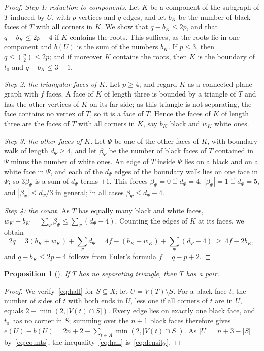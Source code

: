 \documentclass[a4paper]{amsart}
\numberwithin{equation}{section}
\newtheorem{proposition}[equation]{Proposition}
\theoremstyle{definition}
\newcommand{\step}[1]{\emph{#1}\enspace}
\begin{document}
\begin{proof}
\step{Step 1: reduction to components.}
Let $K$ be a component of the subgraph of $T$ induced by $U$, with $p$ vertices and $q$ edges, and let $b_K$ be the number of black faces of $T$ with all corners in $K$.
We show that $q-b_K\le 2p$, and that $q-b_K\le 2p-4$ if $K$ contains the roots.
This suffices, as the roots lie in one component and $b(U)$ is the sum of the numbers $b_K$.
If $p\le3$, then $q\le\binom p2\le 2p$; and if moreover $K$ contains the roots, then $K$ is the boundary of $t_0$ and $q-b_K\le 3-1$.

\step{Step 2: the triangular faces of $K$.}
Let $p\ge4$, and regard $K$ as a connected plane graph with $f$ faces.
A face of $K$ of length three is bounded by a triangle of $T$ and has the other vertices of $K$ on its far side; as this triangle is not separating, the face contains no vertex of $T$, so it is a face of $T$.
Hence the faces of $K$ of length three are the faces of $T$ with all corners in $K$, say $b_K$ black and $w_K$ white ones.

\step{Step 3: the other faces of $K$.}
Let $\Psi$ be one of the other faces of $K$, with boundary walk of length $d_\Psi\ge4$, and let $\beta_\Psi$ be the number of black faces of $T$ contained in $\Psi$ minus the number of white ones.
An edge of $T$ inside $\Psi$ lies on a black and on a white face in $\Psi$, and each of the $d_\Psi$ edges of the boundary walk lies on one face in $\Psi$; so $3\beta_\Psi$ is a sum of $d_\Psi$ terms $\pm1$.
This forces $\beta_\Psi=0$ if $d_\Psi=4$, $|\beta_\Psi|=1$ if $d_\Psi=5$, and $|\beta_\Psi|\le d_\Psi/3$ in general; in all cases $\beta_\Psi\le d_\Psi-4$.

\step{Step 4: the count.}
As $T$ has equally many black and white faces, $w_K-b_K=\sum_\Psi\beta_\Psi\le\sum_\Psi(d_\Psi-4)$.
Counting the edges of $K$ at its faces, we obtain
\[
2q=3(b_K+w_K)+\sum_\Psi d_\Psi=4f-(b_K+w_K)+\sum_\Psi(d_\Psi-4)\ \ge\ 4f-2b_K ,
\]
and $q-b_K\le 2p-4$ follows from Euler's formula $f=q-p+2$.
\end{proof}

\begin{proposition}[{\cite[Proposition~3.1]{OpenAI}}]\label{prop:pair}
If $T$ has no separating triangle, then $T$ has a pair.
\end{proposition}

\begin{proof}
We verify~\eqref{eq:hall} for $S\subseteq X$; let $U=V(T)\setminus S$.
For a black face $t$, the number of sides of $t$ with both ends in $U$, less one if all corners of $t$ are in $U$, equals $2-\min(2,|V(t)\cap S|)$.
Every edge lies on exactly one black face, and $t_0$ has no corner in $S$; summing over the $n+1$ black faces therefore gives $e(U)-b(U)=2n+2-\sum_{t\in A}\min(2,|V(t)\cap S|)$.
As $|U|=n+3-|S|$ by~\eqref{eq:counts}, the inequality~\eqref{eq:hall} is~\eqref{eq:density}.
\end{proof}
\end{document}
